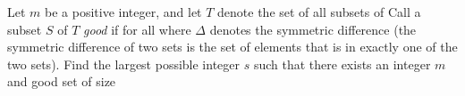 Let $m$ be a positive integer, and let $T$ denote the set of all subsets of  Call a subset $S$ of $T$ \textit{good} if for all    where $\Delta$ denotes the symmetric difference (the symmetric difference of two sets is the set of elements that is in exactly one of the two sets). Find the largest possible integer $s$ such that there exists an integer $m$ and good set of size 